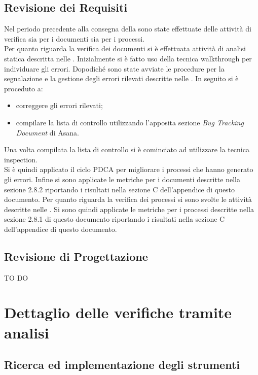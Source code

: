 	\subsection{Revisione dei Requisiti}
	Nel periodo precedente alla consegna della \RR{} sono state effettuate delle attività di verifica sia per i documenti sia per i processi.\\
	Per quanto riguarda la verifica dei documenti si è effettuata attività di analisi statica descritta nelle \docNameVersionNdP. Inizialmente si è fatto uso della tecnica 	walkthrough per individuare gli errori. Dopodiché sono state avviate le procedure per la segnalazione e la gestione degli errori rilevati descritte nelle \docNameVersionNdP.
	In seguito si è proceduto a:
	\begin{itemize}
		\item correggere gli errori rilevati;
		\item compilare la lista di controllo utilizzando l'apposita sezione \emph{Bug Tracking Document} di Asana.
	\end{itemize}
	Una volta compilata la lista di controllo si è cominciato ad utilizzare la tecnica inspection.\\
	Si è quindi applicato il ciclo PDCA per migliorare i processi che hanno generato gli errori. Infine si sono applicate le metriche per i documenti descritte nella sezione 2.8.2 riportando i risultati nella sezione C dell'appendice di questo documento.
	Per quanto riguarda la verifica dei processi si sono svolte le attività descritte nelle \docNameVersionNdP{}. Si sono quindi applicate le metriche per i processi descritte nella sezione 2.8.1 di questo documento riportando i risultati nella sezione C dell'appendice di questo documento.
	\subsection{Revisione di Progettazione}
	TO DO
\pagebreak

\section{Dettaglio delle verifiche tramite analisi}
	\subsection{Ricerca ed implementazione degli strumenti}
